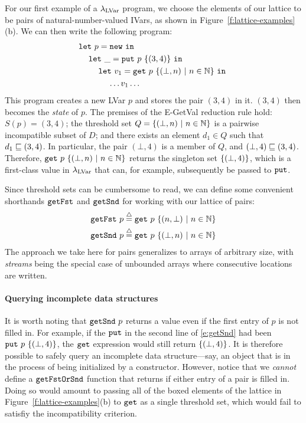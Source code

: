 For our first example of a $\lambda_{\textrm{LVar}}$ program, we choose the
elements of our lattice to be pairs of natural-number-valued IVars, as
shown in Figure~\ref{f:lattice-examples}(b).  We can then write the
following program:
\begin{equation}
\begin{split}
& \letexp{p}{\NEW}{ \\
& \letspace \letexp{\_}{\putexp{p}{\stateset{(3,4)}}}{ \\
& \letspace \letspace \letexp{v_1}{\getexp{p}{\stateset{(\bot, n) \setsep n \in \mathbb{N}}}}{ \\
& \letspace \letspace \letspace \dots v_1 \dots}}}
\end{split}
\label{e:getSnd}
\end{equation}
This program creates a new LVar $p$ and stores the pair $(3, 4)$ in
it.  $(3,4)$ then becomes the \emph{state} of $p$.  The premises of
the {\sc E-GetVal} reduction rule hold: $S(p) = (3,4)$; the threshold
set $Q = \lbrace (\bot, n) \ | \  n \in \mathbb{N} \rbrace$ is a pairwise
incompatible subset of $D$; and there exists an element $d_1 \in Q$
such that $d_1 \sqsubseteq (3,4)$.  In particular, the pair $(\bot, 4)$
is a member of $Q$, and $(\bot,4) \sqsubseteq (3,4)$.  Therefore,
$\mbox{\texttt{get}}~p~\lbrace (\bot, n) \ | \  n \in \mathbb{N} \rbrace$ returns
the singleton set $\lbrace (\bot,4) \rbrace$, {which is a first-class value
  in $\lambda_{\textrm{LVar}}$ that can, for example, subsequently be passed to
  $\mbox{\texttt{put}}$.}

Since threshold sets can be cumbersome to read, we can define some
convenient shorthands $\mbox{\texttt{getFst}}$ and $\mbox{\texttt{getSnd}}$ for working with our
lattice of pairs:
\begin{align*}
\mbox{\texttt{getFst}}~p \stackrel{\triangle}{=} \mbox{\texttt{get}}~p~\lbrace (n, \bot) \ | \  n \in
    \mathbb{N} \rbrace \\
\mbox{\texttt{getSnd}}~p \stackrel{\triangle}{=} \mbox{\texttt{get}}~p~\lbrace (\bot, n) \ | \  n \in
    \mathbb{N} \rbrace
\end{align*}
The approach we take here for pairs generalizes to arrays of arbitrary
size, with \emph{streams} being the special case of unbounded arrays
where consecutive locations are written.

\paragraph{Querying incomplete data structures}

It is worth noting that $\mbox{\texttt{getSnd}}~p$ returns a value even if the
first entry of $p$ is not filled in.  For example, if the $\mbox{\texttt{put}}$ in
the second line of \eqref{e:getSnd} had been
$\mbox{\texttt{put}}~p~\lbrace (\bot,4) \rbrace$, the $\mbox{\texttt{get}}$ expression would still
return $\lbrace (\bot,4) \rbrace$.  It is therefore possible to safely
query an incomplete data structure---say, an object that is in the
process of being initialized by a constructor.  However, notice that
we \emph{cannot} define a $\mbox{\texttt{getFstOrSnd}}$ function that returns if
either entry of a pair is filled in.  Doing so would amount to passing
all of the boxed elements of the lattice in
Figure~\ref{f:lattice-examples}(b) to $\mbox{\texttt{get}}$ as a single threshold
set, which would fail to satisfiy the incompatibility criterion.

